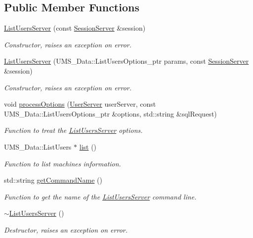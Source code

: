 \subsection*{Public Member Functions}
\begin{DoxyCompactItemize}
\item 
\hyperlink{classListUsersServer_a21aa9106a1ff470ac479651188e2ac31}{ListUsersServer} (const \hyperlink{classSessionServer}{SessionServer} \&session)
\begin{DoxyCompactList}\small\item\em Constructor, raises an exception on error. \item\end{DoxyCompactList}\item 
\hyperlink{classListUsersServer_ae243661035340448b24e3f6848068d56}{ListUsersServer} (UMS\_\-Data::ListUsersOptions\_\-ptr params, const \hyperlink{classSessionServer}{SessionServer} \&session)
\begin{DoxyCompactList}\small\item\em Constructor, raises an exception on error. \item\end{DoxyCompactList}\item 
void \hyperlink{classListUsersServer_ab02a1b44d9a86b07b83f9b403575716f}{processOptions} (\hyperlink{classUserServer}{UserServer} userServer, const UMS\_\-Data::ListUsersOptions\_\-ptr \&options, std::string \&sqlRequest)
\begin{DoxyCompactList}\small\item\em Function to treat the \hyperlink{classListUsersServer}{ListUsersServer} options. \item\end{DoxyCompactList}\item 
UMS\_\-Data::ListUsers $\ast$ \hyperlink{classListUsersServer_aa80dfdc8a71c1bbba1423f8b375e1624}{list} ()
\begin{DoxyCompactList}\small\item\em Function to list machines information. \item\end{DoxyCompactList}\item 
std::string \hyperlink{classListUsersServer_a570f6a88f82b9accd66946136b2fff21}{getCommandName} ()
\begin{DoxyCompactList}\small\item\em Function to get the name of the \hyperlink{classListUsersServer}{ListUsersServer} command line. \item\end{DoxyCompactList}\item 
\hypertarget{classListUsersServer_a2ebe5504e39955f53b797dda01957ace}{
\hyperlink{classListUsersServer_a2ebe5504e39955f53b797dda01957ace}{$\sim$ListUsersServer} ()}
\label{classListUsersServer_a2ebe5504e39955f53b797dda01957ace}

\begin{DoxyCompactList}\small\item\em Destructor, raises an exception on error. \item\end{DoxyCompactList}\end{DoxyCompactItemize}
